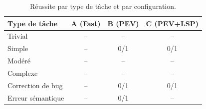 \begin{table}[htbp]
\centering
\caption{Réussite par type de tâche et par configuration.}
\label{tab:bytype}
\begin{tabular}{lccc}
\toprule
Type de tâche & A (Fast) & B (PEV) & C (PEV+LSP) \\
\midrule
Trivial & -- & -- & -- \\
Simple & -- & 0/1 & 0/1 \\
Modéré & -- & -- & -- \\
Complexe & -- & -- & -- \\
Correction de bug & -- & 0/1 & 0/1 \\
Erreur sémantique & -- & 0/1 & -- \\
\bottomrule
\end{tabular}
\end{table}
